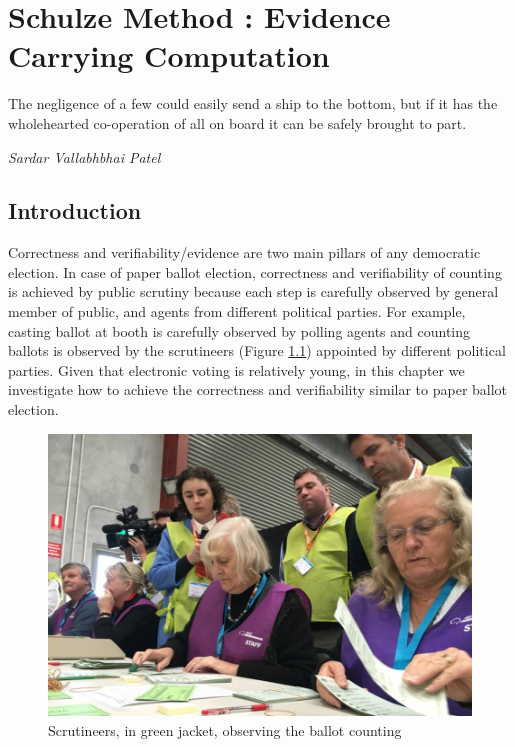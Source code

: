 \chapter{Schulze Method : Evidence Carrying Computation}
\label{cha:schulze_method}

\epigraph{The negligence of a few could easily send a ship to the bottom, but if it has the wholehearted 
co-operation of all on board it can be safely brought to part.} 
{\textit{Sardar Vallabhbhai Patel}} 

\section{Introduction}
 Correctness and verifiability/evidence are two main pillars of any democratic election. 
 In case of paper ballot election, correctness and verifiability of counting is achieved 
 by public scrutiny because each step is carefully observed by general member of public, 
 and agents from different political parties. For example, casting ballot at booth 
 is carefully observed by polling agents and 
 counting ballots is observed by the scrutineers (Figure \ref{fig:scrutineers}) appointed by different political parties.
 Given that electronic voting is relatively young, in this chapter we investigate 
 how to achieve the correctness and verifiability similar to paper ballot election.
 
\begin{figure}[h!]
 \centering
  \includegraphics[width=1\linewidth]{figs/scrutineers.jpg}
  \caption{Scrutineers, in green jacket, observing the ballot counting}
  \label{fig:scrutineers}
  \end{figure} 
 
